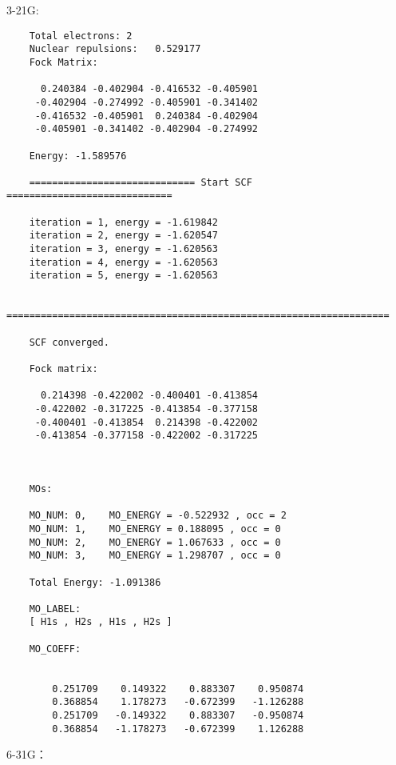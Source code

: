 \documentclass[12pt,a4paper,openany,twoside]{article}
\numberwithin{equation}{section}
\begin{document}
3-21G:
\begin{lstlisting}
    Total electrons: 2
    Nuclear repulsions:   0.529177
    Fock Matrix:
    
      0.240384 -0.402904 -0.416532 -0.405901
     -0.402904 -0.274992 -0.405901 -0.341402
     -0.416532 -0.405901  0.240384 -0.402904
     -0.405901 -0.341402 -0.402904 -0.274992
    
    Energy: -1.589576
    
    ============================= Start SCF =============================
    
    iteration = 1, energy = -1.619842
    iteration = 2, energy = -1.620547
    iteration = 3, energy = -1.620563
    iteration = 4, energy = -1.620563
    iteration = 5, energy = -1.620563
    
    ===================================================================
    
    SCF converged.
    
    Fock matrix:
    
      0.214398 -0.422002 -0.400401 -0.413854
     -0.422002 -0.317225 -0.413854 -0.377158
     -0.400401 -0.413854  0.214398 -0.422002
     -0.413854 -0.377158 -0.422002 -0.317225
    
    
    
    MOs:
    
    MO_NUM: 0,    MO_ENERGY = -0.522932 , occ = 2
    MO_NUM: 1,    MO_ENERGY = 0.188095 , occ = 0
    MO_NUM: 2,    MO_ENERGY = 1.067633 , occ = 0
    MO_NUM: 3,    MO_ENERGY = 1.298707 , occ = 0
    
    Total Energy: -1.091386
    
    MO_LABEL:
    [ H1s , H2s , H1s , H2s ]
    
    MO_COEFF:
    
    
        0.251709    0.149322    0.883307    0.950874
        0.368854    1.178273   -0.672399   -1.126288
        0.251709   -0.149322    0.883307   -0.950874
        0.368854   -1.178273   -0.672399    1.126288
\end{lstlisting}

6-31G：
\end{document}
